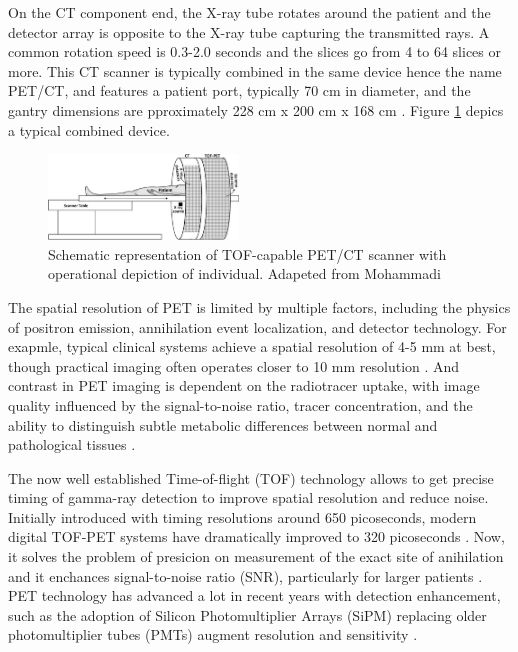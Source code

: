 \begin{multicols}{2}
	
On the CT component end, the X-ray tube rotates around the patient and the detector array is opposite to the X-ray tube capturing the transmitted rays. A common rotation speed is 0.3-2.0 seconds and the slices go from 4 to 64 slices or more. This CT scanner is typically combined in the same device hence the name PET/CT, and features a patient port, typically 70 cm in diameter, and the gantry dimensions are pproximately 228 cm x 200 cm x 168 cm \cite{Townsend2008}. Figure \ref{fig:PETCTtable} depics a typical combined device.

\begin{figure}[H]
	\centering
	\includegraphics[width=0.45\textwidth]{assets/PETCTtable.jpg} 
	\caption{Schematic representation of TOF-capable PET/CT scanner with operational depiction of individual. Adapeted from Mohammadi \cite{figPETCT}}
	\label{fig:PETCTtable} 
\end{figure}

The spatial resolution of PET is limited by multiple factors, including the physics of positron emission, annihilation event localization, and detector technology. For exapmle, typical clinical systems achieve a spatial resolution of 4-5 mm at best, though practical imaging often operates closer to 10 mm resolution \cite{Wang2018}. And contrast in PET imaging is dependent on the radiotracer uptake, with image quality influenced by the signal-to-noise ratio, tracer concentration, and the ability to distinguish subtle metabolic differences between normal and pathological tissues \cite{Moses2011}.

The now well established Time-of-flight (TOF) technology allows to get precise timing of gamma-ray detection to improve spatial resolution and reduce noise. Initially introduced with timing resolutions around 650 picoseconds, modern digital TOF-PET systems have dramatically improved to 320 picoseconds \cite{Walrand2018}. Now, it solves the problem of presicion on measurement of the exact site of anihilation and it enchances signal-to-noise ratio (SNR), particularly for larger patients \cite{Seifert2022}. PET technology has advanced a lot in recent years with detection enhancement, such as the adoption of Silicon Photomultiplier Arrays (SiPM) replacing older photomultiplier tubes (PMTs) augment resolution and sensitivity \cite{SunderlandSeminar}.


\end{multicols}
